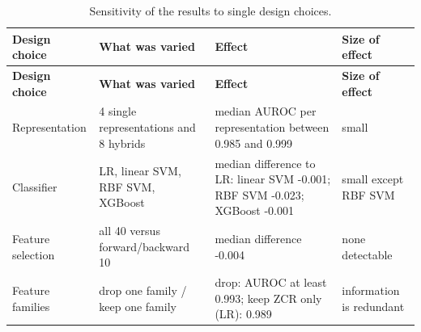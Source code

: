 \documentclass[11pt,a4paper]{article}
\begin{document}
\begin{center}\small\renewcommand{\arraystretch}{1.15}
\begin{longtable}{>{\raggedright\arraybackslash}p{2.66cm}>{\raggedright\arraybackslash}p{4.18cm}>{\raggedright\arraybackslash}p{5.70cm}>{\raggedright\arraybackslash}p{2.28cm}}
\caption{Sensitivity of the results to single design choices.}\\
\toprule
\textbf{\hspace{0pt}Design choice} & \textbf{\hspace{0pt}What was varied} & \textbf{\hspace{0pt}Effect} & \textbf{\hspace{0pt}Size of effect}\\\midrule\endfirsthead
\toprule
\textbf{\hspace{0pt}Design choice} & \textbf{\hspace{0pt}What was varied} & \textbf{\hspace{0pt}Effect} & \textbf{\hspace{0pt}Size of effect}\\\midrule\endhead
\bottomrule\endfoot
\hspace{0pt}Representation & \hspace{0pt}4 single representations and 8 hybrids & \hspace{0pt}median AUROC per representation between 0.985 and 0.999 & \hspace{0pt}small\\
\hspace{0pt}Classifier & \hspace{0pt}LR, linear SVM, RBF SVM, XGBoost & \hspace{0pt}median difference to LR: linear SVM -0.001; RBF SVM -0.023; XGBoost -0.001 & \hspace{0pt}small except RBF SVM\\
\hspace{0pt}Feature selection & \hspace{0pt}all 40 versus forward/\allowbreak{}backward 10 & \hspace{0pt}median difference -0.004 & \hspace{0pt}none detectable\\
\hspace{0pt}Feature families & \hspace{0pt}drop one family /\allowbreak{} keep one family & \hspace{0pt}drop: AUROC at least 0.993; keep ZCR only (LR): 0.989 & \hspace{0pt}information is redundant\\

\end{longtable}
\end{center}
\end{document}
